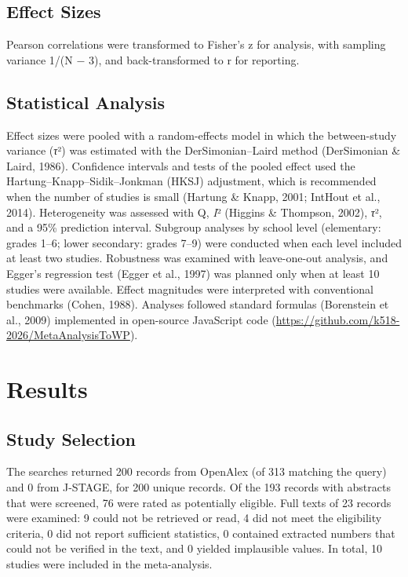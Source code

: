 \documentclass[man,a4paper,12pt,floatsintext,nolmodern,notab]{apa7}
\begin{document}
\subsection{Effect Sizes}
Pearson correlations were transformed to Fisher’s z for analysis, with sampling variance 1/(N \ensuremath{-} 3), and back-transformed to r for reporting.

\subsection{Statistical Analysis}
Effect sizes were pooled with a random-effects model in which the between-study variance (\textit{τ}²) was estimated with the DerSimonian–Laird method (DerSimonian \& Laird, 1986). Confidence intervals and tests of the pooled effect used the Hartung–Knapp–Sidik–Jonkman (HKSJ) adjustment, which is recommended when the number of studies is small (Hartung \& Knapp, 2001; IntHout et al., 2014). Heterogeneity was assessed with Q, \textit{I}² (Higgins \& Thompson, 2002), \textit{τ}², and a 95\% prediction interval. Subgroup analyses by school level (elementary: grades 1–6; lower secondary: grades 7–9) were conducted when each level included at least two studies. Robustness was examined with leave-one-out analysis, and Egger’s regression test (Egger et al., 1997) was planned only when at least 10 studies were available. Effect magnitudes were interpreted with conventional benchmarks (Cohen, 1988). Analyses followed standard formulas (Borenstein et al., 2009) implemented in open-source JavaScript code (\url{https://github.com/k518-2026/MetaAnalysisToWP}).

\section{Results}
\subsection{Study Selection}
The searches returned 200 records from OpenAlex (of 313 matching the query) and 0 from J-STAGE, for 200 unique records. Of the 193 records with abstracts that were screened, 76 were rated as potentially eligible. Full texts of 23 records were examined: 9 could not be retrieved or read, 4 did not meet the eligibility criteria, 0 did not report sufficient statistics, 0 contained extracted numbers that could not be verified in the text, and 0 yielded implausible values. In total, 10 studies were included in the meta-analysis.
\end{document}
